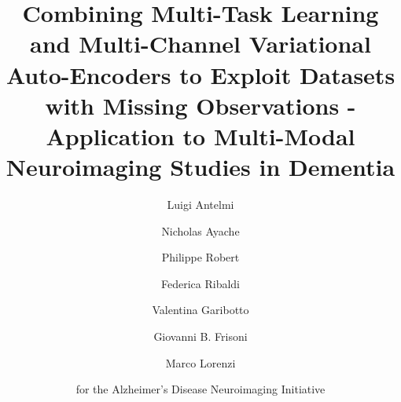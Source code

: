 \documentclass[final,5p,times,twocolumn,authoryear]{elsarticle}
\begin{document}
\begin{frontmatter}



\title{
Combining Multi-Task Learning and Multi-Channel Variational Auto-Encoders to Exploit Datasets with Missing Observations -
Application to Multi-Modal Neuroimaging Studies in Dementia
}

\author{Luigi Antelmi }
\author{Nicholas Ayache }
\author{Philippe Robert}
%
\author{Federica Ribaldi}
\author{Valentina Garibotto}
\author{Giovanni B. Frisoni}
%
\author{Marco Lorenzi}
%
\author{for the Alzheimer's Disease Neuroimaging Initiative }


\end{frontmatter}
\end{document}
